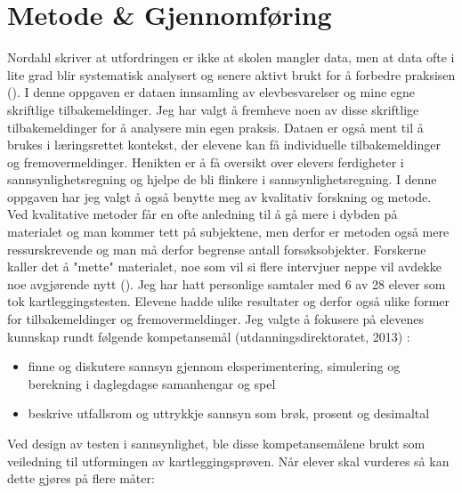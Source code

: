 \documentclass[main.tex]{subfiles}
\begin{document}
\section*{Metode \& Gjennomføring}
\label{sec:2}
Nordahl skriver at utfordringen er ikke at skolen mangler data, men at data ofte i lite grad blir
systematisk analysert og senere aktivt brukt for å forbedre praksisen ().
I denne oppgaven er dataen innsamling av elevbesvarelser og mine egne skriftlige tilbakemeldinger.
Jeg har valgt å fremheve noen av disse skriftlige tilbakemeldinger for å analysere min egen praksis.
Dataen er også ment til å brukes i læringsrettet kontekst, der elevene kan få
individuelle tilbakemeldinger og fremovermeldinger. Henikten er å få oversikt over elevers 
ferdigheter i sannsynlighetsregning og hjelpe de bli flinkere i sannsynlighetsregning.
\newline
\newline
I denne oppgaven har jeg valgt å også benytte meg av kvalitativ forskning og metode. Ved
kvalitative metoder får en ofte anledning til å gå mere i dybden på materialet og man kommer
tett på subjektene, men derfor er metoden også mere ressurskrevende og man må derfor
begrense antall forsøksobjekter. Forskerne kaller det å "mette" materialet, noe som vil si 
flere intervjuer neppe vil avdekke noe avgjørende nytt (). Jeg har hatt
personlige samtaler med 6 av 28 elever som tok kartleggingstesten. Elevene hadde ulike
resultater og derfor også ulike former for tilbakemeldinger og fremovermeldinger.
\newline
\newline
Jeg valgte å fokusere på elevenes kunnskap rundt følgende kompetansemål (utdanningsdirektoratet, 2013) :
\begin{itemize}
\item finne og diskutere sannsyn gjennom eksperimentering, simulering og berekning i daglegdagse samanhengar og spel
\item beskrive utfallsrom og uttrykkje sannsyn som brøk, prosent og desimaltal
\end{itemize}
Ved design av testen i sannsynlighet, ble disse kompetansemålene brukt som veiledning til
utformingen av kartleggingsprøven.
\newline
\newline
Når elever skal vurderes så kan dette gjøres på flere måter:
\end{document}
